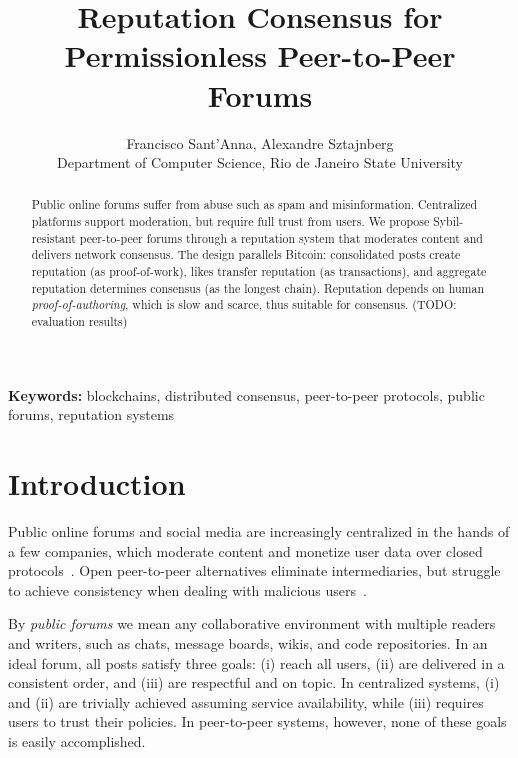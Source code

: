\documentclass[10pt,twocolumn]{article}
\begin{document}
\title {
    Reputation Consensus for Permissionless Peer-to-Peer Forums
}

\author {
    Francisco Sant'Anna, Alexandre Sztajnberg
    \\ Department of Computer Science, Rio de Janeiro State University
}

\maketitle

\begin{abstract}
Public online forums suffer from abuse such as spam and misinformation.
Centralized platforms support moderation, but require full trust from users.
We propose Sybil-resistant peer-to-peer forums through a reputation system that
moderates content and delivers network consensus.
The design parallels Bitcoin:
    consolidated posts create reputation (as proof-of-work),
    likes transfer reputation (as transactions), and
    aggregate reputation determines consensus (as the longest chain).
Reputation depends on human \emph{proof-of-authoring}, which is slow and
scarce, thus suitable for consensus.
(TODO: evaluation results)
\end{abstract}

\noindent\textbf{Keywords:}
blockchains, distributed consensus, peer-to-peer protocols, public forums,
reputation systems

\section{Introduction}
\label{sec.introduction}

Public online forums and social media are increasingly centralized in the hands
of a few companies, which moderate content and monetize user data over closed
protocols~\cite{internet.fixing,p2p.dosn}.
%
Open peer-to-peer alternatives eliminate intermediaries, but struggle to
achieve consistency when dealing with malicious users~\cite{p2p.osn,p2p.byz}.

By \emph{public forums} we mean any collaborative environment with multiple
readers and writers, such as chats, message boards, wikis, and code
repositories.
%
In an ideal forum, all posts satisfy three goals:
(i)   reach all users,
(ii)  are delivered in a consistent order, and
(iii) are respectful and on topic.
In centralized systems, (i) and (ii) are trivially achieved assuming service
availability, while (iii) requires users to trust their policies.
In peer-to-peer systems, however, none of these goals is easily accomplished.
\end{document}
